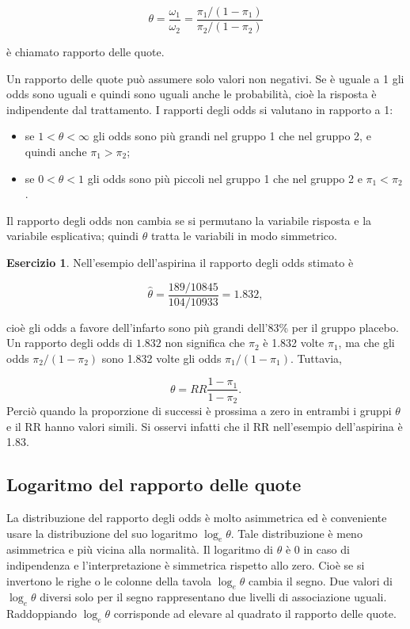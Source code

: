 \documentclass[
  11pt,
]{krantz}
\providecommand{\tightlist}{%
  \setlength{\itemsep}{0pt}\setlength{\parskip}{0pt}}
\theoremstyle{definition}
\theoremstyle{definition}
\theoremstyle{definition}
\newtheorem{exercise}{Esercizio}[chapter]
\theoremstyle{definition}
\theoremstyle{remark}
\begin{document}
\[
\theta = \frac{\omega_1}{\omega_2}=\frac{\pi_1 / (1-\pi_1)}{\pi_2 / (1-\pi_2)}
\]

è chiamato rapporto delle quote.

Un rapporto delle quote può assumere solo valori non negativi. Se è uguale a 1 gli odds sono uguali e quindi sono uguali anche le probabilità, cioè la risposta è indipendente dal trattamento. I rapporti degli odds si valutano in rapporto a 1:

\begin{itemize}
\tightlist
\item
  se \(1 < \theta < \infty\) gli odds sono più grandi nel gruppo 1 che nel gruppo 2, e quindi anche \(\pi_1 > \pi_2\);
\item
  se \(0 < \theta < 1\) gli odds sono più piccoli nel gruppo 1 che nel gruppo 2 e \(\pi_1 < \pi_2\).
\end{itemize}

Il rapporto degli odds non cambia se si permutano la variabile risposta e la variabile esplicativa; quindi \(\theta\) tratta le variabili in modo simmetrico.

\begin{exercise}
Nell'esempio dell'aspirina il rapporto degli odds stimato è

\[
\hat{\theta} = \frac{189/10845}{104/10933}= 1.832,
\]

cioè gli odds a favore dell'infarto sono più grandi dell'83\% per il gruppo placebo. Un rapporto degli odds di \(1.832\) non significa che \(\pi_2\) è 1.832 volte \(\pi_1\), ma che gli odds \(\pi_2/(1 - \pi_2)\) sono 1.832 volte gli odds \(\pi_1/(1 - \pi_1)\). Tuttavia,

\[
\theta = RR \frac{1-\pi_1}{1-\pi_2}.
\] Perciò quando la proporzione di successi è prossima a zero in entrambi i gruppi \(\theta\) e il RR hanno valori simili. Si osservi infatti che il RR nell'esempio dell'aspirina è 1.83.
\end{exercise}

\hypertarget{logaritmo-del-rapporto-delle-quote}{%
\subsection{Logaritmo del rapporto delle quote}\label{logaritmo-del-rapporto-delle-quote}}

La distribuzione del rapporto degli odds è molto asimmetrica ed è conveniente usare la distribuzione del suo logaritmo \(\log_e \theta\). Tale distribuzione è meno asimmetrica e più vicina alla normalità. Il logaritmo di \(\theta\) è 0 in caso di indipendenza e l'interpretazione è simmetrica rispetto allo zero. Cioè se si invertono le righe o le colonne della tavola \(\log_e \theta\) cambia il segno. Due valori di \(\log_e \theta\) diversi solo per il segno rappresentano due livelli di associazione uguali. Raddoppiando \(\log_e \theta\) corrisponde ad elevare al quadrato il rapporto delle quote.
\end{document}
